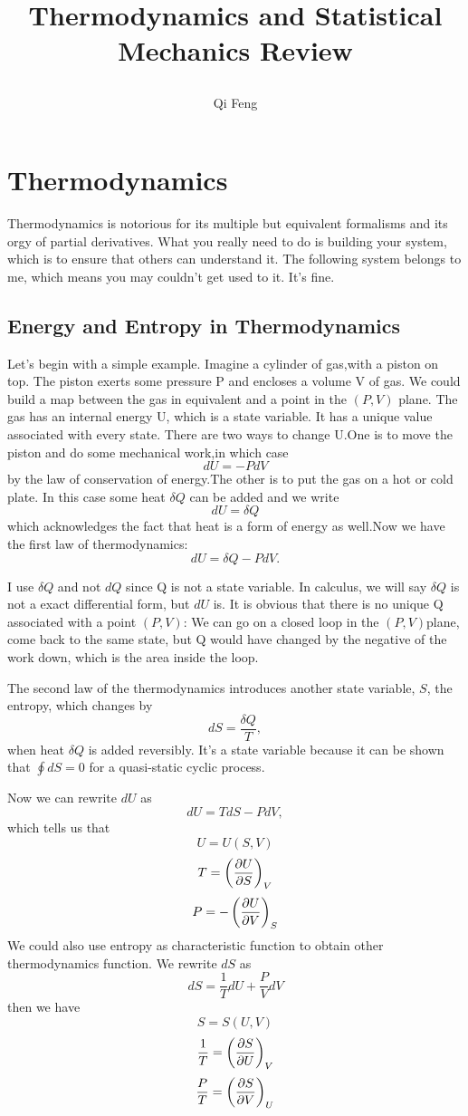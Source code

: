 \documentclass[10pt]{article}
\title{\begin{center}{Thermodynamics and Statistical Mechanics Review}\end{center}}
\author{Qi Feng}
\affiliation{
	University of Science and Technology of China
}
\begin{document}
	\maketitle
	\section{Thermodynamics}	
	Thermodynamics is notorious for its multiple but equivalent formalisms and its orgy of partial derivatives. What you really need to do is building your system, which is to ensure that others can understand it. The following system belongs to me, which means you may couldn't get used to it. It's fine.
	\subsection{Energy and Entropy in Thermodynamics}\label{Energy and Entropy in Thermodynamics}
	Let's begin with a simple example. Imagine a cylinder of gas,with a piston on top. The piston exerts some pressure P and encloses a volume V of gas. We could build a map between the gas in equivalent and a point in the $(P,V)$ plane. The gas has an internal energy U, which is a state variable. It has a unique value associated with every state. There are two ways to change U.One is to move the piston and do some mechanical work,in which case $$dU=-PdV$$ by the law of conservation of energy.The other is to put the gas on a hot or cold plate. In this case some heat $\delta Q$ can be added and we write $$dU=\delta Q$$ which acknowledges the fact that heat is a form of energy as well.Now we have the first law of thermodynamics:$$dU=\delta Q-P dV.$$
	
	I use $\delta Q$ and not $dQ$ since Q is not a state variable. In calculus, we will say $\delta Q$ is not a exact differential form, but $dU$ is. It is obvious that there is no unique Q associated with a point $(P,V)$: We can go on a closed loop in the $(P,V)$plane, come back to the same state, but Q would have changed by the negative of the work down, which is the area inside the loop.
	
	The second law of the thermodynamics introduces another state variable, $S$, the entropy, which changes by$$dS=\frac{\delta Q}{T},$$when heat $\delta Q$ is added reversibly. It's a state variable because it can be shown that $\oint dS=0$ for a quasi-static cyclic process.
	
	Now we can rewrite $dU$ as $$dU=TdS-PdV,$$which tells us that $$U=U(S,V)$$ $$T=\left(\pdv{U}{S}\right)_V$$ $$P=-\left(\pdv{U}{V}\right)_S$$
	We could also use entropy as characteristic function to obtain other thermodynamics function. We rewrite $dS$ as $$dS=\frac{1}{T}dU+\frac{P}{V} dV$$
	then we have $$S=S(U,V)$$ $$\frac{1}{T}=\left(\pdv{S}{U}\right)_V$$ $$\frac{P}{T}=\left(\pdv{S}{V}\right)_U$$
	
\end{document}
